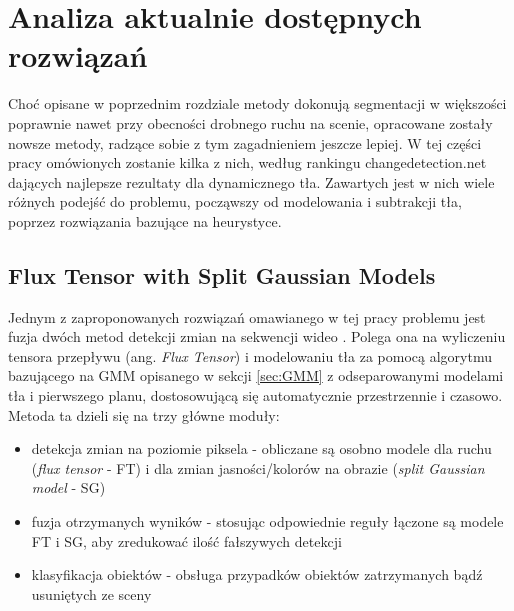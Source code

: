 \chapter{Analiza aktualnie dostępnych rozwiązań}
\label{cha:analiza}

Choć opisane w poprzednim rozdziale metody dokonują segmentacji w większości poprawnie nawet przy obecności drobnego ruchu na scenie, opracowane zostały nowsze metody, radzące sobie z tym zagadnieniem jeszcze lepiej. W tej części pracy omówionych zostanie kilka z nich, według rankingu changedetection.net dających najlepsze rezultaty dla dynamicznego tła. Zawartych jest w nich wiele różnych podejść do problemu, począwszy od modelowania i subtrakcji tła, poprzez rozwiązania bazujące na heurystyce.


\section{Flux Tensor with Split Gaussian Models}
\label{sec:FTSG}

Jednym z zaproponowanych rozwiązań omawianego w tej pracy problemu jest fuzja dwóch metod detekcji zmian na sekwencji wideo \cite{6910016}. Polega ona na wyliczeniu tensora przepływu (ang. \textit{Flux Tensor}) i modelowaniu tła za pomocą algorytmu bazującego na GMM opisanego w sekcji \ref{sec:GMM} z odseparowanymi modelami tła i pierwszego planu, dostosowującą się automatycznie przestrzennie i czasowo.
Metoda ta dzieli się na trzy główne moduły:
\begin{itemize}
\item detekcja zmian na poziomie piksela - obliczane są osobno modele dla ruchu (\textit{flux tensor} - FT) i dla zmian jasności/kolorów na obrazie (\textit{split Gaussian model} - SG)
\item fuzja otrzymanych wyników - stosując odpowiednie reguły łączone są modele FT i SG, aby zredukować ilość fałszywych detekcji
\item klasyfikacja obiektów - obsługa przypadków obiektów zatrzymanych bądź usuniętych ze sceny
\end{itemize}
